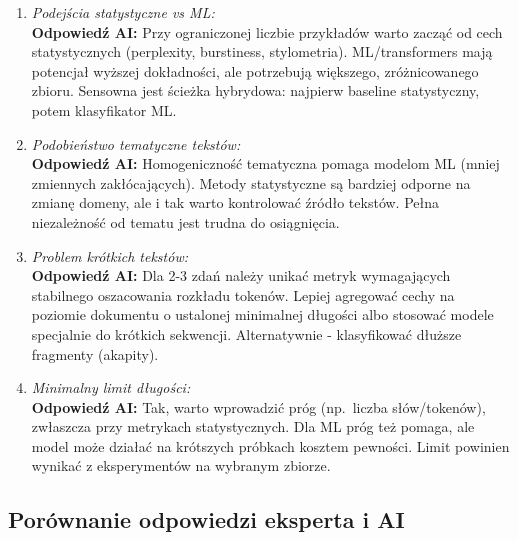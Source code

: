 \begin{enumerate}
	\item \textit{Podejścia statystyczne vs ML:}\\
	\textbf{Odpowiedź AI:} Przy ograniczonej liczbie przykładów warto zacząć od cech statystycznych (perplexity, burstiness, stylometria). ML/transformers mają potencjał wyższej dokładności, ale potrzebują większego, zróżnicowanego zbioru. Sensowna jest ścieżka hybrydowa: najpierw baseline statystyczny, potem klasyfikator ML.

	\item \textit{Podobieństwo tematyczne tekstów:}\\
	\textbf{Odpowiedź AI:} Homogeniczność tematyczna pomaga modelom ML (mniej zmiennych zakłócających). Metody statystyczne są bardziej odporne na zmianę domeny, ale i tak warto kontrolować źródło tekstów. Pełna niezależność od tematu jest trudna do osiągnięcia.

	\item \textit{Problem krótkich tekstów:}\\
	\textbf{Odpowiedź AI:} Dla 2-3 zdań należy unikać metryk wymagających stabilnego oszacowania rozkładu tokenów. Lepiej agregować cechy na poziomie dokumentu o ustalonej minimalnej długości albo stosować modele specjalnie do krótkich sekwencji. Alternatywnie - klasyfikować dłuższe fragmenty (akapity).

	\item \textit{Minimalny limit długości:}\\
	\textbf{Odpowiedź AI:} Tak, warto wprowadzić próg (np.\ liczba słów/tokenów), zwłaszcza przy metrykach statystycznych. Dla ML próg też pomaga, ale model może działać na krótszych próbkach kosztem pewności. Limit powinien wynikać z eksperymentów na wybranym zbiorze.
\end{enumerate}

\subsection{Porównanie odpowiedzi eksperta i AI}

